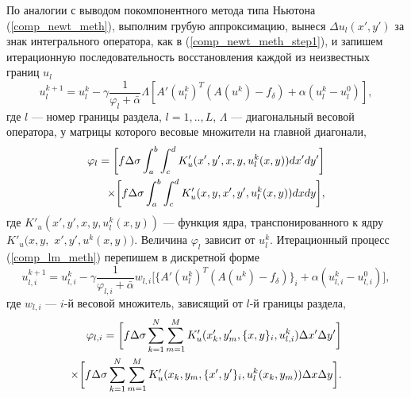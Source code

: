 По аналогии с выводом покомпонентного метода типа Ньютона (\ref{comp_newt_meth}), выполним грубую аппроксимацию, вынеся $\Delta u_l(x',y')$ за знак интегрального оператора, как в (\ref{comp_newt_meth_step1}), и запишем итерационную последовательность восстановления каждой из неизвестных границ $u_l$
\begin{equation}\label{comp_lm_meth}
u_l^{k+1}=u_l^k-\gamma\frac{1}{\varphi_l+\bar{\alpha}}\Lambda[ A'(u_l^k)^T(A(u^k)-f_\delta)+\alpha (u_l^k-u_l^0)],
\end{equation}
где $l$ --- номер границы раздела, $l=1,..,L$, $\Lambda$ --- диагональный весовой оператора, у матрицы которого весовые множители  на главной диагонали, 
\begin{equation*}
\begin{aligned}
\varphi_l=\bigg[ f\Delta\sigma\int_{a}^{b}\int_{c}^{d}
K'_u(x',y', x, y, u_l^k(x,y))dx'dy'\bigg] \notag \\ \times\bigg[f\Delta\sigma\int_{a}^{b}\int_{c}^{d}K'_u(x,y, x',y',u_l^k(x,y))dxdy\bigg], 
\end{aligned}
\end{equation*} 
где $K'_u(x',y', x, y, u_l^k(x,y))$ --- функция ядра, транспонированного к ядру $K'_u(x,y,$ $ x',y',u^k(x,y))$. Величина $\varphi_l$ зависит от $u_l^k$.
Итерационный процесс (\ref{comp_lm_meth}) перепишем в дискретной форме
\begin{equation}\label{comp_lm_meth_disc}
u_{l,i}^{k+1}=u_{l,i}^k-\gamma\frac{1}{\varphi_{l,i}+\bar{\alpha}}w_{l,i}\bigg[ \{A'(u_l^k)^T(A(u^k)-f_\delta)\}_i+\alpha (u_{l,i}^k-u_{l,i}^0)\bigg],
\end{equation}
где $w_{l,i}$ --- $i$-й весовой множитель, зависящий от $l$-й границы раздела,
\begin{equation*}
\begin{aligned}
\varphi_{l,i}=\bigg[ f\Delta\sigma\sum\limits_{k=1}^{N}
\sum\limits_{m=1}^{M}
K'_u(x'_k,y'_m, \{x, y\}_i, u_{l,i}^k) \Delta x' \Delta y'\bigg] \notag \\ \times\bigg[f\Delta\sigma\sum\limits_{k=1}^{N}
\sum\limits_{m=1}^{M}K'_u(x_k,y_m, \{x',y'\}_i,u_l^k(x_k,y_m))\Delta x \Delta y\bigg]. 
\end{aligned}
\end{equation*}

